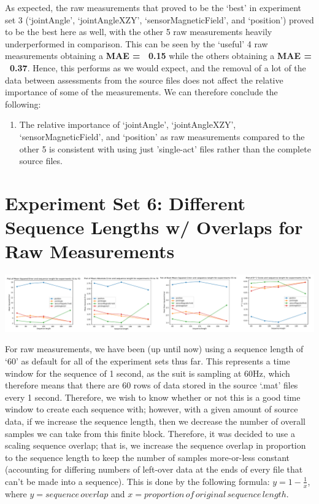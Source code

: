 \documentclass[12pt,twoside]{report}
\begin{document}
\quad As expected, the raw measurements that proved to be the ‘best’ in experiment set 3 (‘jointAngle’, ‘jointAngleXZY’, ‘sensorMagneticField’, and ‘position’) proved to be the best here as well, with the other 5 raw measurements heavily underperformed in comparison. This can be seen by the ‘useful’ 4 raw measurements obtaining a \textbf{MAE = ~0.15} while the others obtaining a \textbf{MAE = ~0.37}. Hence, this performs as we would expect, and the removal of a lot of the data between assessments from the source files does not affect the relative importance of some of the measurements. We can therefore conclude the following:

\begin{enumerate}
	\item The relative importance of ‘jointAngle’, ‘jointAngleXZY’, ‘sensorMagneticField’, and ‘position’ as raw measurements compared to the other 5 is consistent with using just 'single-act' files rather than the complete source files.
\end{enumerate}





\section{Experiment Set 6: Different Sequence Lengths w/ Overlaps for Raw Measurements}

\begin{center}
\includegraphics[scale=0.4]{project_figures/fig10_13}
\end{center}

\quad For raw measurements, we have been (up until now) using a sequence length of ‘60’ as default for all of the experiment sets thus far. This represents a time window for the sequence of 1 second, as the suit is sampling at 60Hz, which therefore means that there are 60 rows of data stored in the source ‘.mat’ files every 1 second. Therefore, we wish to know whether or not this is a good time window to create each sequence with; however, with a given amount of source data, if we increase the sequence length, then we decrease the number of overall samples we can take from this finite block. Therefore, it was decided to use a scaling sequence overlap; that is, we increase the sequence overlap in proportion to the sequence length to keep the number of samples more-or-less constant (accounting for differing numbers of left-over data at the ends of every file that can’t be made into a sequence). This is done by the following formula: $y=1-\frac{1}{x}$, where $y=sequence\, overlap$ and $x=proportion\, of\, original\, sequence\, length$.\\
\end{document}
